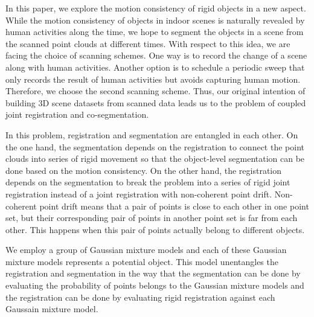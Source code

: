 In this paper, we explore the motion consistency of rigid objects in a new aspect.
While the motion consistency of objects in indoor scenes is naturally revealed by human activities along the time, we hope to segment the objects in a scene from the scanned point clouds at different times. 
With respect to this idea, we are facing the choice of scanning schemes. One way is to record the change of a scene along with human activities. Another option is to schedule a periodic sweep that only records the result of human activities but avoids capturing human motion. 
%
Therefore, we choose the second scanning scheme. 
Thus, our original intention of building 3D scene datasets from scanned data leads us to the problem of coupled joint registration and co-segmentation.


In this problem, registration and segmentation are entangled in each other. On the one hand, the segmentation depends on the registration to connect the point clouds into series of rigid movement so that the object-level segmentation can be done based on the motion consistency. On the other hand, the registration depends on the segmentation to break the problem into a series of rigid joint registration instead of a joint registration with non-coherent point drift. 
Non-coherent point drift means that a pair of points is close to each other in one point set, but their corresponding pair of points in another point set is far from each other. 
This happens when this pair of points actually belong to different objects.
%


We employ a group of Gaussian mixture models and each of these Gaussian mixture models represents a potential object. 
This model unentangles the registration and segmentation in the way that the segmentation can be done by evaluating the probability of points belongs to the Gaussian mixture models and the registration can be done by evaluating rigid registration against each Gaussain mixture model.


